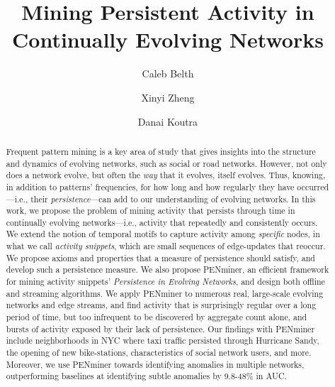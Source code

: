 \documentclass[sigconf]{acmart}
\newcommand{\method}{PENminer\xspace}
\begin{document}
\fancyhead{}
\title{Mining Persistent Activity in Continually Evolving Networks}

\author{Caleb Belth}

\author{Xinyi Zheng}

\author{Danai Koutra}

\begin{abstract}
Frequent pattern mining is a key area of study that gives insights into the structure and dynamics of evolving networks, such as social or road networks. 
However, not only does a network evolve, but often the \emph{way} that it evolves, itself evolves. Thus, knowing, in addition to patterns' frequencies, for how long and how regularly they have occurred---i.e., their \emph{persistence}---can add to our understanding of evolving networks. 
In this work, we propose the problem of mining activity that persists through time in continually evolving networks---i.e., activity that repeatedly and consistently occurs. 
We extend the notion of temporal motifs to capture activity among \emph{specific} nodes, in what we call \emph{activity snippets}, which are small sequences of edge-updates 
that reoccur. We propose axioms and properties that a measure of persistence should satisfy, and develop such a persistence measure. We also propose \method, an efficient framework for mining activity snippets' \emph{Persistence in Evolving Networks}, and 
design both offline and streaming algorithms. We apply \method to numerous real, large-scale evolving networks and edge streams, and 
find activity that is surprisingly regular over a long period of time, 
but too infrequent to be discovered by aggregate count alone, and bursts of activity exposed by their lack of persistence. Our findings with \method include neighborhoods in NYC where taxi traffic persisted through Hurricane Sandy, 
the opening of new bike-stations, characteristics of social network users, and more. 
Moreover, we use \method towards identifying anomalies in multiple networks, outperforming baselines at identifying subtle anomalies by 9.8-48\% in AUC.
\end{abstract}

\maketitle
\end{document}

